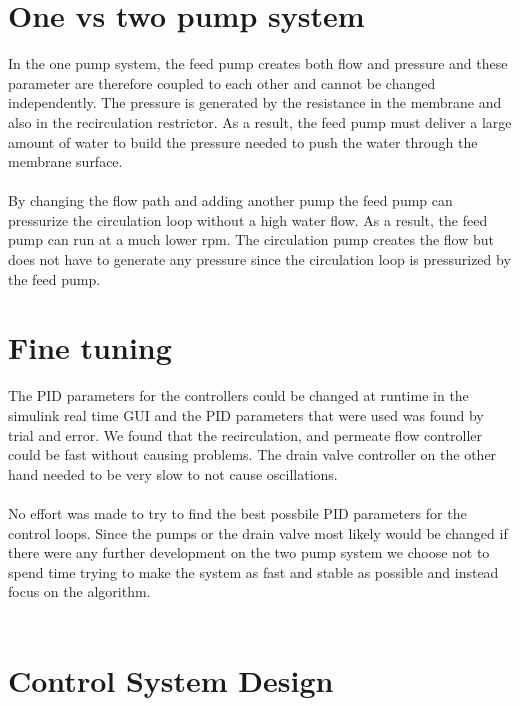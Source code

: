 \section{One vs two pump system}

In the one pump system, the feed pump creates both flow and pressure and these parameter are therefore coupled to each other and cannot be changed independently. The pressure is generated by the resistance in the membrane and also in the recirculation restrictor. As a result, the feed pump must deliver a large amount of water to build the pressure needed to push the water through the membrane surface. \\
\\
By changing the flow path and adding another pump the feed pump can pressurize the circulation loop without a high water flow. As a result, the feed pump can run at a much lower rpm. The circulation pump creates the flow but does not have to generate any pressure since the circulation loop is pressurized by the feed pump.

\section{Fine tuning}

The PID parameters for the controllers could be changed at runtime in the simulink real time GUI and the PID parameters that were used was found by trial and error. We found that the recirculation, and permeate flow controller could be fast without causing problems. The drain valve controller on the other hand needed to be very slow to not cause oscillations. \\
\\
No effort was made to try to find the best possbile PID parameters for the control loops. Since the pumps or the drain valve most likely would be changed if there were any further development on the two pump system we choose not to spend time trying to make the system as fast and stable as possible and instead focus on the algorithm. \\
\\
\section{Control System Design}

